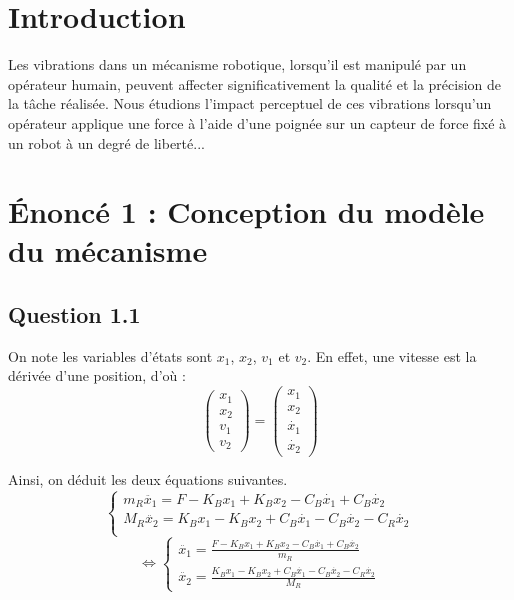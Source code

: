 \documentclass[a4paper,11pt]{article}
\begin{document}
\tableofcontents
\newpage

\section*{Introduction}
    Les vibrations dans un mécanisme robotique, lorsqu’il est manipulé par un opérateur humain, peuvent affecter significativement la qualité et la précision de la tâche réalisée. Nous étudions l'impact perceptuel de ces vibrations lorsqu’un opérateur applique une force à l’aide d’une poignée sur un capteur de force fixé à un robot à un degré de liberté...

\section{Énoncé 1 : Conception du modèle du mécanisme}
\subsection{Question 1.1}
On note les variables d'états sont $x_{1}$, $x_{2}$, $v_{1}$ et $v_{2}$. En effet, une vitesse est la dérivée d'une position, d'où :
\[
    \begin{pmatrix}
        x_{1}\\
        x_{2}\\
        v_{1}\\
        v_{2}
    \end{pmatrix}
    =
    \begin{pmatrix}
        x_{1}\\
        x_{2}\\
        \dot{x_{1}}\\
        \dot{x_{2}}
    \end{pmatrix}
\]


Ainsi, on déduit les deux équations suivantes.
\[
    \begin{cases}
        m_{R}\ddot{x_{1}} = F - K_{B}x_{1} + K_{B}x_{2} - C_{B}\dot{x_{1}} + C_{B}\dot{x_{2}} \\
        M_{R}\ddot{x_{2}} = K_{B}x_{1} - K_{B}x_{2} + C_{B}\dot{x_{1}} - C_{B}\dot{x_{2}} - C_{R}\dot{x_{2}} \\
    \end{cases}
\]
\[
    \Leftrightarrow
    \begin{cases}
        \ddot{x_{1}} = \frac{F - K_{B}x_{1} + K_{B}x_{2} - C_{B}\dot{x_{1}} + C_{B}\dot{x_{2}}}{m_{R}} \\
        \ddot{x_{2}} = \frac{K_{B}x_{1} - K_{B}x_{2} + C_{B}\dot{x_{1}} - C_{B}\dot{x_{2}} - C_{R}\dot{x_{2}}}{M_{R}}
    \end{cases}
\]
\end{document}
